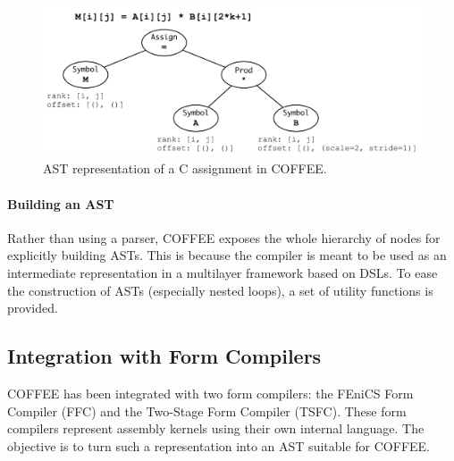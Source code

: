 \begin{figure}
\begin{center}
\includegraphics[scale=0.70]{coffee/pictures/coffee-ast.pdf}
\caption{AST representation of a C assignment in COFFEE.}
\label{fig:coffee-ast-vs-c}
\end{center}
\end{figure}

\paragraph{Building an AST}
Rather than using a parser, COFFEE exposes the whole hierarchy of nodes for explicitly building ASTs. This is because the compiler is meant to be used as an intermediate representation in a multilayer framework based on DSLs. To ease the construction of ASTs (especially nested loops), a set of utility functions is provided. 

\subsection{Integration with Form Compilers}
COFFEE has been integrated with two form compilers: the FEniCS Form Compiler (FFC) and the Two-Stage Form Compiler (TSFC). These form compilers represent assembly kernels using their own internal language. The objective is to turn such a representation into an AST suitable for COFFEE. 

